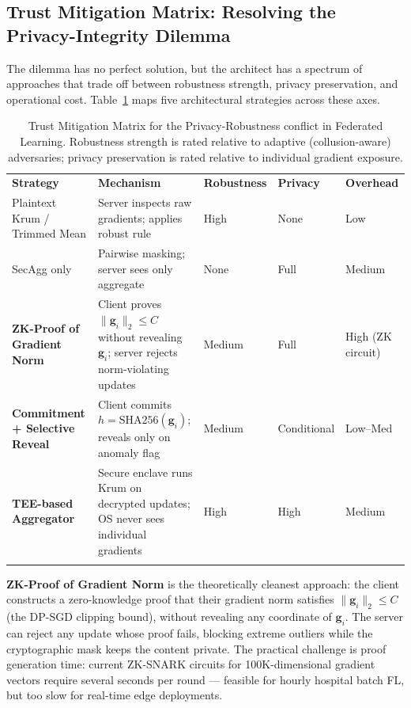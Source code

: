 \subsection{Trust Mitigation Matrix: Resolving the Privacy-Integrity Dilemma}
\label{subsec:trust_mitigation_matrix}

The dilemma has no perfect solution, but the architect has a spectrum of approaches that trade off between robustness strength, privacy preservation, and operational cost. Table~\ref{tab:trust_mitigation_matrix} maps five architectural strategies across these axes.

\begin{table}[ht]
\centering
\caption{Trust Mitigation Matrix for the Privacy-Robustness conflict in Federated Learning. Robustness strength is rated relative to adaptive (collusion-aware) adversaries; privacy preservation is rated relative to individual gradient exposure.}
\label{tab:trust_mitigation_matrix}
\renewcommand{\arraystretch}{1.3}
\begin{tabular}{p{3.0cm} p{3.2cm} p{1.6cm} p{1.6cm} p{2.4cm}}
\hline\noalign{\smallskip}
\textbf{Strategy} & \textbf{Mechanism} & \textbf{Robustness} & \textbf{Privacy} & \textbf{Overhead} \\
\noalign{\smallskip}\svhline\noalign{\smallskip}
Plaintext Krum / Trimmed Mean & Server inspects raw gradients; applies robust rule & High & \cellcolor{costhigh}None & Low \\[3pt]
SecAgg only & Pairwise masking; server sees only aggregate & None & \cellcolor{costlow}Full & Medium \\[3pt]
\textbf{ZK-Proof of Gradient Norm} & Client proves $\|\mathbf{g}_i\|_2 \leq C$ without revealing $\mathbf{g}_i$; server rejects norm-violating updates & Medium & \cellcolor{costlow}Full & \cellcolor{costhigh}High (ZK circuit) \\[3pt]
\textbf{Commitment + Selective Reveal} & Client commits $h = \mathrm{SHA256}(\mathbf{g}_i)$; reveals only on anomaly flag & Medium & \cellcolor{costmed}Conditional & Low--Med \\[3pt]
\textbf{TEE-based Aggregator} & Secure enclave runs Krum on decrypted updates; OS never sees individual gradients & \cellcolor{costlow}High & \cellcolor{costlow}High & Medium \\
\noalign{\smallskip}\hline\noalign{\smallskip}
\end{tabular}
\end{table}

\textbf{ZK-Proof of Gradient Norm} is the theoretically cleanest approach: the client constructs a zero-knowledge proof that their gradient norm satisfies $\|\mathbf{g}_i\|_2 \leq C$ (the DP-SGD clipping bound), without revealing any coordinate of $\mathbf{g}_i$. The server can reject any update whose proof fails, blocking extreme outliers while the cryptographic mask keeps the content private. The practical challenge is proof generation time: current ZK-SNARK circuits for 100K-dimensional gradient vectors require several seconds per round --- feasible for hourly hospital batch FL, but too slow for real-time edge deployments.

